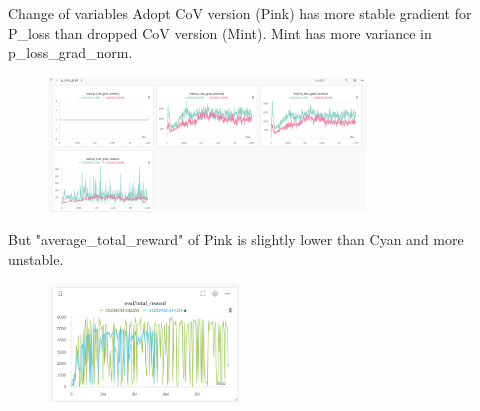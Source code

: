 \documentclass[8pt]{beamer}
\begin{document}
\begin{frame}{Change of variables}
    Adopt CoV version (Pink) has more stable gradient for P\_loss than dropped CoV version (Mint). Mint has more variance in p\_loss\_grad\_norm.
    \begin{figure}
        \includegraphics[width=0.75\textwidth]{MoreStablePLoss.png}
    \end{figure}

    But "average\_total\_reward" of Pink is slightly lower than Cyan and more unstable.
    \begin{figure}
        \includegraphics[width=0.45\textwidth]{CoVReturns.png}
    \end{figure}
\end{frame}
\end{document}
